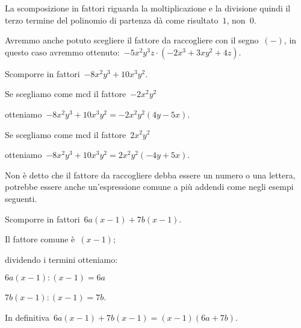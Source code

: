\osservazione La scomposizione in fattori riguarda la moltiplicazione e la 
 divisione quindi il terzo termine del polinomio di partenza dà come 
 risultato~\(1\), non~\(0\).
 
\osservazione Avremmo anche potuto scegliere il fattore da raccogliere 
 con il segno~\((-)\), in questo caso avremmo 
 ottenuto:~\(-5x^{2}y^{3}z\cdot (-2x^{3}+3xy^{2}+4z)\).
 
 \begin{esempio}
Scomporre in fattori~\(-8x^{2}y^{3}+10x^{3}y^{2}\).
 \begin{enumerate*}
 \item \begin{enumeratea}
  \item Se scegliamo come mcd il fattore~\(-2x^{2}y^{2}\)
  \item otteniamo~\(-8x^{2}y^{3}+10x^{3}y^{2}=-2x^{2}y^{2}(4y-5x)\).
 \end{enumeratea}
 \item \begin{enumeratea}
  \item Se scegliamo come mcd il fattore~\(2x^{2}y^{2}\)
  \item otteniamo~\(-8x^{2}y^{3}+10x^{3}y^{2}=2x^{2}y^{2}(-4y+5x)\).
 \end{enumeratea}
 \end{enumerate*}
 \end{esempio}



Non è detto che il fattore da raccogliere debba essere un numero o una lettera, 
potrebbe essere anche un'espressione comune a più addendi come negli esempi 
seguenti.



 \begin{esempio}
Scomporre in fattori~\(6a(x-1)+7b(x-1)\).
  \begin{enumeratea}
  \item Il fattore comune è~\((x-1)\); 
  \item dividendo i termini otteniamo:
   \begin{itemize*}
    \item \(6a(x-1):(x-1)=6a\)
    \item \(7b(x-1):(x-1)=7b\).
   \end{itemize*}
  \end{enumeratea}
  \item In definitiva~\(6a(x-1)+7b(x-1)=(x-1)(6a+7b)\).
 \end{esempio}

